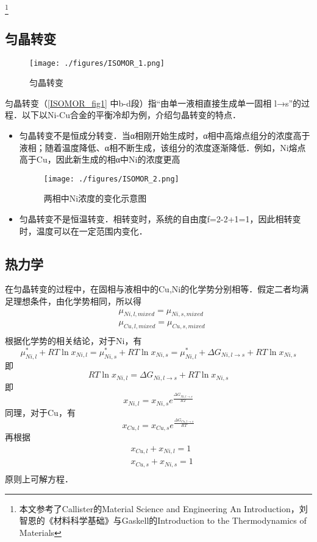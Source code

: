 \footnote{本文参考了Callister的Material Science and Engineering An Introduction，刘智恩的《材料科学基础》与Gaskell的Introduction to the Thermodynamics of Materials}

\subsection{匀晶转变}
\begin{figure}[ht]
\centering
\texttt{[image: ./figures/ISOMOR\_1.png]}
\caption{匀晶转变} \label{ISOMOR_fig1}
\end{figure}

匀晶转变（\autoref{ISOMOR_fig1} 中b-d段）指“由单一液相直接生成单一固相 l→s”的过程．以下以Ni-Cu合金的平衡冷却为例，介绍匀晶转变的特点．

\begin{itemize}
\item 匀晶转变不是恒成分转变．当α相刚开始生成时，α相中高熔点组分的浓度高于液相；随着温度降低、α相不断生成，该组分的浓度逐渐降低．例如，Ni熔点高于Cu，因此新生成的相α中Ni的浓度更高
\begin{figure}[ht]
\centering
\texttt{[image: ./figures/ISOMOR\_2.png]}
\caption{两相中Ni浓度的变化示意图} \label{ISOMOR_fig2}
\end{figure}

\item 匀晶转变不是恒温转变．相转变时，系统的自由度f=2-2+1=1，因此相转变时，温度可以在一定范围内变化．
\end{itemize}

\subsection{热力学}
在匀晶转变的过程中，在固相与液相中的Cu,Ni的化学势分别相等．假定二者均满足理想条件，由化学势相同，所以得
\begin{align}
&\mu_{Ni,l,mixed}=\mu_{Ni,s,mixed}\\
&\mu_{Cu,l,mixed}=\mu_{Cu,s,mixed}\\
\end{align}
根据化学势的相关结论，对于Ni，有
$$
\mu_{Ni,l}^*+RT \ln x_{Ni,l}=\mu_{Ni,s}^*+RT \ln x_{Ni,s}=\mu_{Ni,l}^*+\Delta G_{Ni, l\rightarrow s} + RT \ln x_{Ni,s}
$$
即
$$
RT \ln x_{Ni,l}=\Delta G_{Ni, l\rightarrow s} + RT \ln x_{Ni,s}
$$
即
\begin{equation}
x_{Ni,l}=x_{Ni,s}e^{\frac{\Delta G_{Ni, l\rightarrow s}}{RT}}
\end{equation}
同理，对于Cu，有
\begin{equation}
x_{Cu,l}=x_{Cu,s}e^{\frac{\Delta G_{Cu, l\rightarrow s}}{RT}}
\end{equation}
再根据
\begin{align}
&x_{Cu,l}+x_{Ni,l}=1\\
&x_{Cu,s}+x_{Ni,s}=1\\
\end{align}
原则上可解方程．
